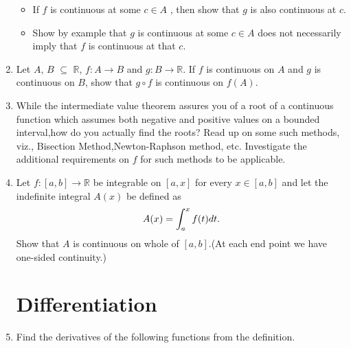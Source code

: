 \documentclass[journal,12pt,onecolumn]{IEEEtran}
\begin{document}
\begin{enumerate}
\setlength\itemsep{2em}
\begin{itemize}
\item If $f$ is continuous at some $c\in A$ , then show that $g$ is also continuous at $c$.
\item Show by example that $g$ is continuous at some $c\in A$ does not necessarily imply that $f$ is continuous at that $c$.
\end{itemize}

\item Let $A$, $B$ $\subseteq$ $\mathbb{R}$, $f:A \rightarrow B$ and $g:B \rightarrow \mathbb{R}$. If $f$ is continuous on $A$ and $g$ is continuous on $B$, show that $g\circ f$  is continuous on $f(A)$.

\item While the intermediate value theorem assures you of a root of a continuous function which assumes both negative and positive values on a bounded interval,how do you actually find the roots? Read up on some such methods, viz., Bisection Method,Newton-Raphson method, etc. Investigate the additional requirements on $f$ for such methods to be applicable.

\item Let $f:[a,b]\rightarrow\mathbb{R}$ be integrable on $[a,x]$ for every $x\in [a,b]$ and let the indefinite integral $A(x)$ be defined as
\begin{equation*}
A(x)=\int_{a}^{x}f(t)dt.\\
\end{equation*}
Show that $A$ is continuous on whole of $[a,b]$.(At each end point we have one-sided continuity.)\\

\section{Differentiation}


\item Find the derivatives of the following functions from the definition.                   

\begin{enumerate}[(i)]
\end{enumerate}
\end{enumerate}
\end{document}
